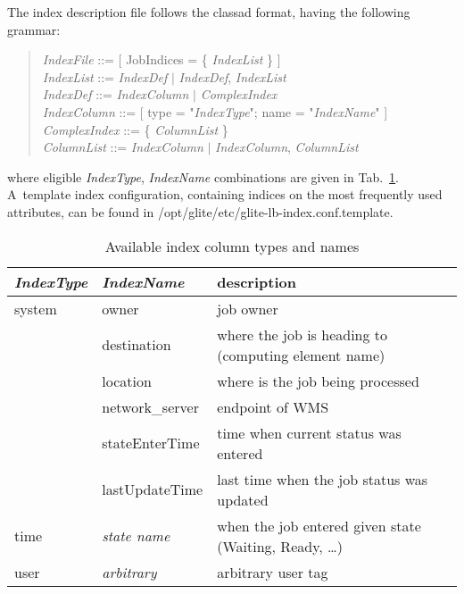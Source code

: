 The index description file follows the classad format, having the following grammar:
\begin{quote}
\emph{IndexFile} ::= [ JobIndices = \{ \emph{IndexList} \} ] \\
\emph{IndexList} ::= \emph{IndexDef} $|$ \emph{IndexDef}, \emph{IndexList} \\
\emph{IndexDef} ::= \emph{IndexColumn} $|$ \emph{ComplexIndex} \\
\emph{IndexColumn} ::= [ type = "\emph{IndexType}"; name = "\emph{IndexName}" ]\\
\emph{ComplexIndex} ::= \{ \emph{ColumnList} \} \\
\emph{ColumnList} ::= \emph{IndexColumn} $|$ \emph{IndexColumn}, \emph{ColumnList}
\end{quote}

where eligible \emph{IndexType}, \emph{IndexName} combinations are given
in Tab.~\ref{t:indexcols}.
A~template index configuration, containing indices on the most frequently
used attributes, can be found in /opt/glite/etc/glite-lb-index.conf.template.


\begin{table}
\begin{center}
\begin{tabularx}{.9\hsize}{|l|l|X|}
\hline
\emph{IndexType} & \emph{IndexName} & description \\
\hline
system & owner & job owner \\
 & destination & where the job is heading to (computing element name) \\
 & location & where is the job being processed \\
 & network\_server & endpoint of WMS \\
 & stateEnterTime & time when current status was entered \\
 & lastUpdateTime & last time when the job status was updated \\
\hline
time & \emph{state name} & when the job entered given state (Waiting, Ready, \dots) \\
\hline
user & \emph{arbitrary} & arbitrary user tag \\
\hline
\end{tabularx}
\end{center}
\caption{Available index column types and names}
\label{t:indexcols}
\end{table}


